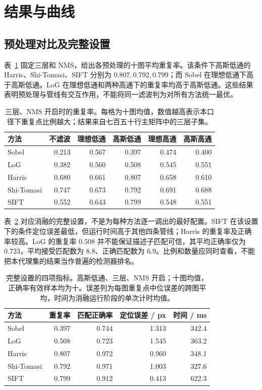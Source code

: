 \section{结果与曲线}
\subsection{预处理对比及完整设置}
表~\ref{tab:filters} 固定三层和 NMS，给出各预处理的十图平均重复率。该条件下高斯低通的 Harris、Shi-Tomasi、SIFT 分别为 $0.807,0.792,0.799$；而 Sobel 在理想低通下高于高斯低通。LoG 在理想低通和两种高通下的重复率均高于高斯低通。这些结果表明预处理与管线有交互作用，不能将同一滤波判为对所有方法统一最优。

\begin{table}[H]
\centering\small
\caption{三层、NMS 开启时的重复率。每格为十图均值，数值越高表示本口径下重复点比例越大；结果来自七百五十行主矩阵中的三层子集。}
\label{tab:filters}
\setlength{\tabcolsep}{7pt}
\begin{tabular}{lrrrrr}
\toprule
方法 & 不滤波 & 理想低通 & 高斯低通 & 理想高通 & 高斯高通\\
\midrule
Sobel & 0.213 & 0.567 & 0.397 & 0.474 & 0.400\\
LoG & 0.382 & 0.560 & 0.508 & 0.545 & 0.551\\
Harris & 0.680 & 0.661 & 0.807 & 0.658 & 0.610\\
Shi-Tomasi & 0.747 & 0.673 & 0.792 & 0.691 & 0.688\\
SIFT & 0.552 & 0.643 & 0.799 & 0.548 & 0.551\\
\bottomrule
\end{tabular}
\end{table}

表~\ref{tab:full} 对应消融的完整设置，不是为每种方法逐一调出的最好配置。SIFT 在该设置下的条件定位误差最低，但运行时间高于其他四条管线；Harris 的重复率及正确率较高。LoG 的重复率 $0.508$ 并不能保证描述子匹配可信，其平均正确率仅为 $0.723$，平均接受匹配数为 $8.8$、正确匹配数为 $6.9$。比例和数量应同时查看，不能把本代理集的结果当作普遍的检测器排名。

\begin{table}[H]
\centering\small
\caption{完整设置的四项指标。高斯低通、三层、NMS 开启；十图均值，正确率有效样本均为十。误差列为每图重复点中位误差的跨图平均，时间为消融运行阶段的单次计时均值。}
\label{tab:full}
\begin{tabular}{lrrrr}
\toprule
方法 & 重复率 & 匹配正确率 & 定位误差 / px & 时间 / ms\\
\midrule
Sobel & 0.397 & 0.744 & 1.313 & 342.4\\
LoG & 0.508 & 0.723 & 1.545 & 363.2\\
Harris & 0.807 & 0.972 & 0.960 & 348.1\\
Shi-Tomasi & 0.792 & 0.971 & 1.003 & 327.6\\
SIFT & 0.799 & 0.912 & 0.413 & 622.3\\
\bottomrule
\end{tabular}
\end{table}


